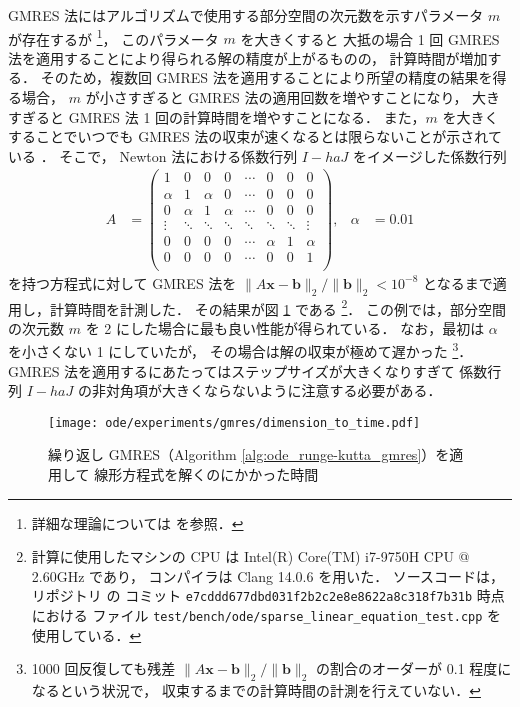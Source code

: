 GMRES 法にはアルゴリズムで使用する部分空間の次元数を示すパラメータ $m$ が存在するが
\footnote{詳細な理論については \cite[Section 11.4.3]{Golub2013} を参照．}，
このパラメータ $m$ を大きくすると
大抵の場合 1 回 GMRES 法を適用することにより得られる解の精度が上がるものの，
計算時間が増加する．
そのため，複数回 GMRES 法を適用することにより所望の精度の結果を得る場合，
$m$ が小さすぎると GMRES 法の適用回数を増やすことになり，
大きすぎると GMRES 法 1 回の計算時間を増やすことになる．
また，$m$ を大きくすることでいつでも GMRES 法の収束が速くなるとは限らないことが示されている
\cite{Blom2013}．
そこで，
Newton 法における係数行列 $I - h a J$ をイメージした係数行列
\begin{align}
    A      & =
    \begin{pmatrix}
        1      & 0      & 0      & 0      & \cdots & 0      & 0      & 0      \\
        \alpha & 1      & \alpha & 0      & \cdots & 0      & 0      & 0      \\
        0      & \alpha & 1      & \alpha & \cdots & 0      & 0      & 0      \\
        \vdots & \ddots & \ddots & \ddots & \ddots & \ddots & \ddots & \vdots \\
        0      & 0      & 0      & 0      & \cdots & \alpha & 1      & \alpha \\
        0      & 0      & 0      & 0      & \cdots & 0      & 0      & 1      \\
    \end{pmatrix}
    ,      &
    \alpha & = 0.01
\end{align}
を持つ方程式に対して GMRES 法を
$\|A\bm{x} - \bm{b}\|_2 / \|\bm{b}\|_2 < 10^{-8}$
となるまで適用し，計算時間を計測した．
その結果が図 \ref{fig:ode_runge-kutta_gmres_subspace-dimension-to-processing-time} である
\footnote{計算に使用したマシンの CPU は Intel(R) Core(TM) i7-9750H CPU @ 2.60GHz であり，%
    コンパイラは Clang 14.0.6 を用いた．%
    ソースコードは，リポジトリ \cite{NumericalCollectionCpp} の%
    コミット \texttt{e7cddd677dbd031f2b2c2e8e8622a8c318f7b31b} 時点における%
    ファイル \texttt{test/bench/ode/sparse\_linear\_equation\_test.cpp} を使用している．}．
この例では，部分空間の次元数 $m$ を 2 にした場合に最も良い性能が得られている．
なお，最初は $\alpha$ を小さくない 1 にしていたが，
その場合は解の収束が極めて遅かった
\footnote{1000 回反復しても残差 $\|A\bm{x} - \bm{b}\|_2 / \|\bm{b}\|_2$ の割合のオーダーが%
    0.1 程度になるという状況で，%
    収束するまでの計算時間の計測を行えていない．}．
GMRES 法を適用するにあたってはステップサイズが大きくなりすぎて
係数行列 $I - h a J$ の非対角項が大きくならないように注意する必要がある．

\begin{figure}[tp]
    \centering
    \texttt{[image: ode/experiments/gmres/dimension\_to\_time.pdf]}
    \caption{繰り返し GMRES（Algorithm \ref{alg:ode_runge-kutta_gmres}）を適用して%
        線形方程式を解くのにかかった時間}
    \label{fig:ode_runge-kutta_gmres_subspace-dimension-to-processing-time}
\end{figure}

\clearpage

